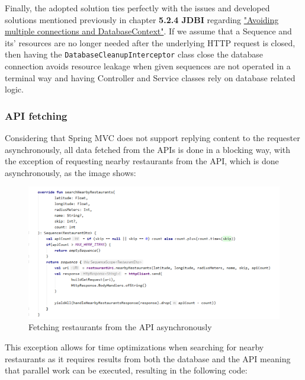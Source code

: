 Finally, the adopted solution ties perfectly with the issues and developed solutions mentioned previously in chapter \textbf{5.2.4 JDBI} regarding \underline{"Avoiding multiple connections and DatabaseContext"}.
If we assume that a Sequence and its' resources are no longer needed after the underlying HTTP request is closed, then having the \texttt{DatabaseCleanupInterceptor} class close the
database connection avoids resource leakage when given sequences are not operated in a terminal way and having Controller and Service classes rely on database  related logic.

\subsubsection{API fetching}

Considering that Spring MVC does not support replying content to the requester asynchronously, all data fetched from the APIs is done in a blocking way,
with the exception of requesting nearby restaurants from the API, which is done asynchronously, as the image shows:\\

\begin{figure}[H]
    \begin{center}
        \includegraphics[scale=0.6]{_figures/Fetching restaurants from the API asynchronously.png}
        \caption{Fetching restaurants from the API asynchronously}
    \end{center}
\end{figure}

This exception allows for time optimizations when searching for nearby restaurants as it requires results from both the database and the API meaning that
parallel work can be executed, resulting in the following code:\\

